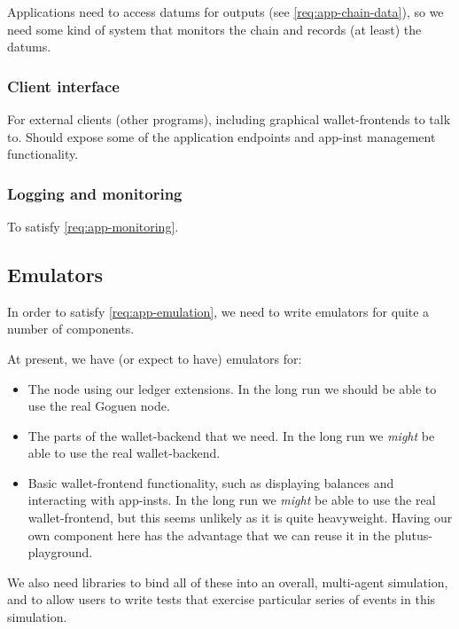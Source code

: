 \subsubsection{}

Applications need to access \glspl{datum} for outputs (see \cref{req:app-chain-data}), so we need some kind of system that monitors the chain and records (at least) the \glspl{datum}.

\subsubsection{Client interface}

For external clients (other programs), including graphical \glspl{wallet-frontend} to talk to.
Should expose some of the application endpoints and \gls{app-inst} management functionality.

\subsubsection{Logging and monitoring}

To satisfy \cref{req:app-monitoring}.

\subsection{Emulators}

In order to satisfy \cref{req:app-emulation}, we need to write emulators for quite a number of components.

At present, we have (or expect to have) emulators for:
\begin{itemize}
\item
  The \gls{node} using our ledger extensions.
  In the long run we should be able to use the real Goguen \gls{node}.
\item
  The parts of the \gls{wallet-backend} that we need.
  In the long run we \emph{might} be able to use the real \gls{wallet-backend}.
\item
  Basic \gls{wallet-frontend} functionality, such as displaying balances and interacting with \glspl{app-inst}.
  In the long run we \emph{might} be able to use the real \gls{wallet-frontend}, but this seems unlikely as it is quite heavyweight.
  Having our own component here has the advantage that we can reuse it in the \gls{plutus-playground}.
\end{itemize}

We also need libraries to bind all of these into an overall, multi-agent simulation, and to allow users to write tests that exercise particular series of events in this simulation.

